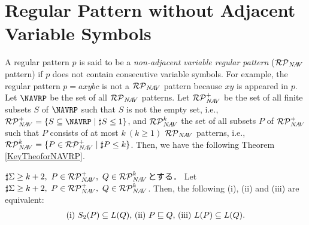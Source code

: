 \section{Regular Pattern without Adjacent Variable Symbols}

A regular pattern $p$ is said to be a {\it non-adjacent variable regular pattern} ($\mathcal{RP}_{N\!A\!V}$ pattern)  
if $p$ does not contain consecutive variable symbols.
For example, the regular pattern $p=axybc$ is not a $\mathcal{RP}_{N\!A\!V}$ pattern because $xy$ is appeared in $p$.
Let $\NAVRP$ be the set of all $\mathcal{RP}_{N\!A\!V}$ patterns.
Let $\mathcal{RP}^{+}_{N\!A\!V}$ be the set of all finite subsets $S$ of $\NAVRP$ such that $S$ is not the empty set, i.e., $\NAVRPplus=\{S \subseteq \NAVRP \mid \sharp S \leq 1\}$,
and $\mathcal{RP}^{k}_{N\!A\!V}$ the set of all subsets $P$ of $\mathcal{RP}^{+}_{N\!A\!V}$ such that $P$ consists of at most $k~(k\geq 1)$ $\mathcal{RP}_{N\!A\!V}$ patterns, i.e., $\mathcal{RP}^{k}_{N\!A\!V}=\{P\in \mathcal{RP}^{+}_{N\!A\!V} \mid \sharp P \leq k\}$.
Then, we have the following Theorem \ref{KeyTheoforNAVRP}.

\begin{thm}\label{KeyTheoforNAVRP}%
  $\sharp \Sigma \ge k+2,~P\in \mathcal{RP}^{+}_{N\!A\!V},~Q \in \mathcal{RP}^{k}_{N\!A\!V}$とする．
Let $\sharp \Sigma \ge k+2,~P\in \mathcal{RP}^{+}_{N\!A\!V},~Q \in \mathcal{RP}^{k}_{N\!A\!V}$.  
Then, the following (i), (ii) and (iii) are equivalent:
\[
\begin{tabular}{ll}
(i) $S_{2}(P) \subseteq L(Q)$,
(ii) $P \sqsubseteq Q$,
(iii) $L(P) \subseteq L(Q)$.
\end{tabular}
\]
\end{thm}


